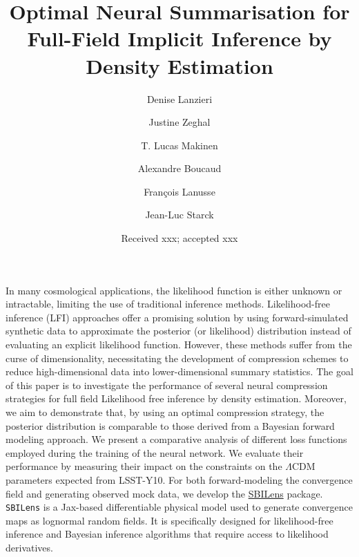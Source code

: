 \documentclass{aa}
\begin{document}
 

\title{Optimal Neural Summarisation for Full-Field Implicit Inference by Density Estimation }

\newcommand{\justine}[1]{{\color{cyan}JZ: #1}}
\newcommand{\denise}[1]{{\color{red}DL: #1}}
\newcommand{\FL}[1]{{\color{magenta}FL: #1}}
\newcommand{\LM}[1]{{\color{olive}LM: #1}}

\author{Denise Lanzieri 
\and
Justine Zeghal 
\and
T. Lucas Makinen 
\and
Alexandre Boucaud 
\and
Fran\c{c}ois Lanusse 
\and
Jean-Luc Starck 
}
\titlerunning{}
\date{Received xxx; accepted xxx}


 
  \abstract
   {In many cosmological applications, the likelihood function is either unknown or intractable, limiting the use of traditional inference methods. Likelihood-free inference (LFI) approaches offer a promising solution by using forward-simulated synthetic data to approximate the posterior (or likelihood) distribution instead of evaluating an explicit likelihood function. However, these methods suffer from the curse of dimensionality, necessitating the development of compression schemes to reduce high-dimensional data into lower-dimensional summary statistics.
   }   
    {The goal of this paper is to investigate the performance of several neural compression strategies for full field Likelihood free inference by density estimation. Moreover, we aim to demonstrate that, by using an optimal compression strategy, the posterior distribution is comparable to those derived from a Bayesian forward modeling approach.}  
    { We present a comparative analysis of different loss functions employed during the training of the neural network. We evaluate their performance by measuring their impact on the constraints on the $\Lambda$CDM parameters expected from LSST-Y10.
    For both forward-modeling the convergence field and generating observed mock data, we develop the \href{https://github.com/DifferentiableUniverseInitiative/sbi_lens}{\url{SBILens}} package. 
    \texttt{SBILens} is a Jax-based differentiable physical model used to generate convergence maps as lognormal random fields. It is specifically designed for likelihood-free inference and Bayesian inference algorithms that require access to likelihood derivatives.}
    
\end{document}
